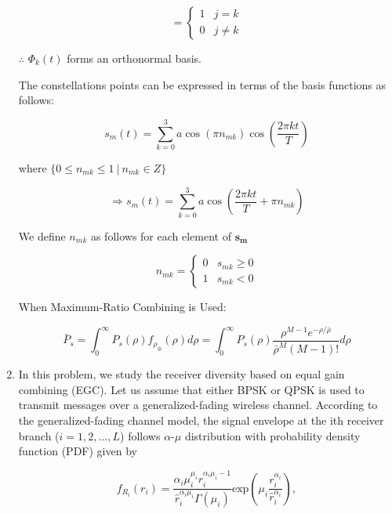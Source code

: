 \documentclass[fleqn]{article}
\makeatletter
\newenvironment{equationCenter}{\@fleqnfalse\begin{equation*}}{\end{equation*}}
\makeatother
\begin{document}
\begin{enumerate}
		\begin{equation*}
			= \begin{cases}
				1 & j = k \\
				0 & j \neq k
			\end{cases}
		\end{equation*}
		
		$\therefore$ $\Phi_k(t)$ forms an orthonormal basis.
		
		The constellations points can be expressed in terms of the basis functions as follows:
		
		\begin{equation*}
			s_m(t) = \sum_{k=0}^{3}{a\cos({\pi}n_{mk})\cos\left(\frac{2{\pi}kt}{T}\right)}
		\end{equation*}
		
		where $\{0 \leq n_{mk} \leq 1\ \vert\ n_{mk} \in Z\}$
		
		\begin{equation*}
			\Rightarrow s_m(t) = \sum_{k=0}^{3}{a\cos\left(\frac{2{\pi}kt}{T}+{\pi}n_{mk}\right)}
		\end{equation*}
		
		We define $n_{mk}$ as follows for each element of $\mathbf{s_m}$
		
		\begin{equation*}
			n_{mk} = \begin{cases}
				0 & s_{mk} \geq 0\\
				1 & s_{mk} < 0
			\end{cases}
		\end{equation*}
		
		When Maximum-Ratio Combining is Used:
		
		\begin{equation*}
			\bar{P}_s = \int_{0}^{\infty}{P_s(\rho)f_{\rho_{\oplus}}(\rho)d\rho} = \int_{0}^{\infty}{P_s(\rho)\frac{\rho^{M-1}e^{-\rho/\bar{\rho}}}{\bar{\rho}^M(M-1)!}d\rho}
		\end{equation*}
		
		\item In this problem, we study the receiver diversity based on equal gain combining (EGC). Let us assume that either BPSK or QPSK is used to transmit messages over a generalized-fading wireless channel. According to
the generalized-fading channel model, the signal envelope at the ith receiver branch ($i=1,2,\ldots,L$) follows $\alpha$-$\mu$ distribution with probability density function (PDF) given by

		\begin{equationCenter}
			f_{R_i}(r_i) = \frac{\alpha_i\mu_i^{\mu_i}r_i^{\alpha_i\mu_i-1}}{\hat{r}_i^{\alpha_i\mu_i}\Gamma(\mu_i)}\text{exp}\left(\mu_i\frac{r_i^{\alpha_i}}{\hat{r}_i^{\alpha_i}}\right),
		\end{equationCenter}
		

\end{enumerate}
\end{document}
